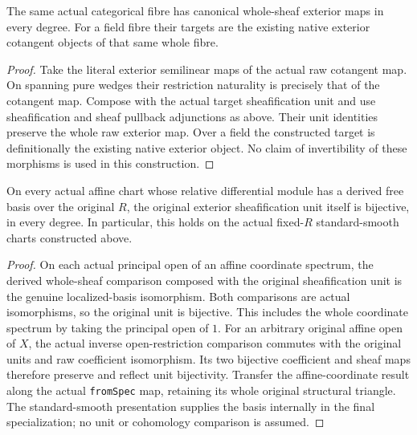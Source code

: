 \begin{lemma}
\label{lem:kn-arithmetic-global-exterior-basechange-map}
\leanok
{}
The same actual categorical fibre has canonical whole-sheaf exterior maps in
every degree.  For a field fibre their targets are the existing native
exterior cotangent objects of that same whole fibre.
\end{lemma}
\begin{proof}
Take the literal exterior semilinear maps of the actual raw cotangent map.
On spanning pure wedges their restriction naturality is precisely that of
the cotangent map.  Compose with the actual target sheafification unit and
use sheafification and sheaf pullback adjunctions as above.  Their unit
identities preserve the whole raw exterior map.  Over a field the constructed
target is definitionally the existing native exterior object.  No claim of
invertibility of these morphisms is used in this construction.
\end{proof}

\begin{lemma}
\label{lem:kn-arithmetic-global-affine-unit}
\leanok
On every actual affine chart whose relative differential module has a
derived free basis over the original $R$, the original exterior
sheafification unit itself is bijective, in every degree.  In particular,
this holds on the actual fixed-$R$ standard-smooth charts constructed above.
\end{lemma}
\begin{proof}
On each actual principal open of an affine coordinate spectrum, the derived
whole-sheaf comparison composed with the original sheafification unit is
the genuine localized-basis isomorphism.  Both comparisons are actual
isomorphisms, so the original unit is bijective.  This includes the whole
coordinate spectrum by taking the principal open of $1$.  For an arbitrary
original affine open of $X$, the actual inverse open-restriction comparison
commutes with the original units and raw coefficient isomorphism.  Its two
bijective coefficient and sheaf maps therefore preserve and reflect unit
bijectivity.  Transfer the affine-coordinate result along the actual
\texttt{fromSpec} map, retaining its whole original structural triangle.
The standard-smooth presentation supplies the basis internally in the final
specialization; no unit or cohomology comparison is assumed.
\end{proof}

